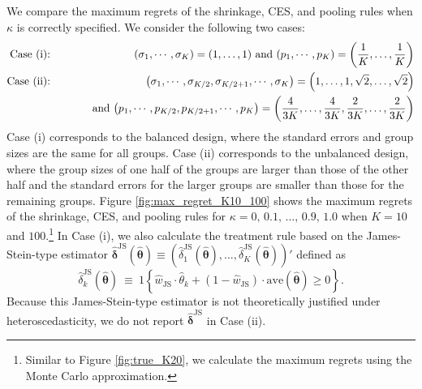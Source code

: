 \documentclass[12pt,a4paper]{article}
\begin{document}
We compare the maximum regrets of the shrinkage, CES, and pooling rules when $\kappa$ is correctly specified. We consider the following two cases:
\begin{eqnarray*}
    \text{Case (i):} & & \text{$\left( \sigma_1, \cdots, \sigma_K \right) = \left( 1, \ldots, 1 \right)$ and $\left( p_1, \cdots, p_K \right) = \left( \frac{1}{K}, \ldots, \frac{1}{K} \right)$} \\
    \text{Case (ii):} & & \text{$\left( \sigma_1, \cdots, \sigma_{K/2}, \sigma_{K/2+1}, \cdots, \sigma_K \right) = \left( 1, \ldots, 1, \sqrt{2}, \ldots, \sqrt{2} \right)$} \\
    & & \hspace{0.4in} \text{and $\left( p_1, \cdots, p_{K/2}, p_{K/2+1}, \cdots, p_K \right) = \left( \frac{4}{3K}, \ldots, \frac{4}{3K}, \frac{2}{3K}, \ldots, \frac{2}{3K} \right)$}
\end{eqnarray*}
Case (i) corresponds to the balanced design, where the standard errors and group sizes are the same for all groups. Case (ii) corresponds to the unbalanced design, where the group sizes of one half of the groups are larger than those of the other half and the standard errors for the larger groups are smaller than those for the remaining groups. Figure \ref{fig:max_regret_K10_100} shows the maximum regrets of the shrinkage, CES, and pooling rules for $\kappa = 0, \, 0.1, \, \ldots, \, 0.9, \, 1.0$ when $K=10$ and $100$.\footnote{Similar to Figure \ref{fig:true_K20}, we calculate the maximum regrets using the Monte Carlo approximation.} In Case (i), we also calculate the treatment rule based on the James-Stein-type estimator $\hat{\bm{\delta}}^{\mathrm{JS}}(\hat{\bm{\theta}}) \equiv \left( \hat{\delta}^{\mathrm{JS}}_1(\hat{\bm{\theta}}), \ldots , \hat{\delta}^{\mathrm{JS}}_K(\hat{\bm{\theta}}) \right)'$ defined as
\[
\hat{\delta}^{\mathrm{JS}}_k(\hat{\bm{\theta}}) \ \equiv \ 1 \left\{ \hat{w}_{\mathrm{JS}} \cdot \hat{\theta}_k + (1-\hat{w}_{\mathrm{JS}}) \cdot \mathrm{ave}(\hat{\bm{\theta}}) \geq 0 \right\}.
\]
Because this James-Stein-type estimator is not theoretically justified under heteroscedasticity, we do not report $\hat{\bm{\delta}}^{\mathrm{JS}}$ in Case (ii).
\end{document}
